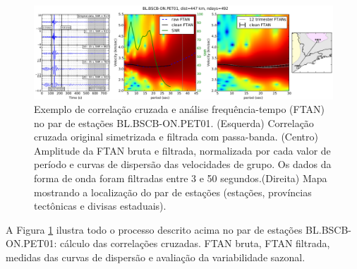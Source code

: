 \begin{figure}[!ht]
\centering
\includegraphics[scale=0.3]{correlacao_FTAN.png}
\caption{Exemplo de correlação cruzada e análise frequência-tempo (FTAN) no par de estações BL.BSCB-ON.PET01. (Esquerda) Correlação cruzada original simetrizada e filtrada com passa-banda. (Centro) Amplitude da FTAN bruta e filtrada, normalizada por cada valor de período e curvas de dispersão das velocidades de grupo. Os dados da forma de onda foram filtradas entre 3 e 50 segundos.(Direita) Mapa mostrando a localização do par de estações (estações, províncias tectônicas e divisas estaduais).}
\label{correlacao_FTAN}
\end{figure} 

A Figura \ref{correlacao_FTAN} ilustra todo o processo descrito acima no par de estações BL.BSCB-ON.PET01: cálculo das correlações cruzadas. FTAN bruta, FTAN filtrada, medidas das curvas de dispersão e avaliação da variabilidade sazonal. 
